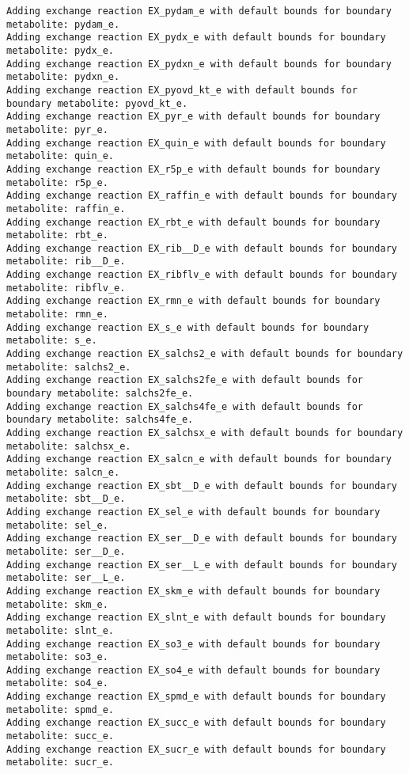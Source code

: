 \documentclass[
  letterpaper,
  DIV=11,
  numbers=noendperiod]{scrartcl}
\begin{document}
\begin{verbatim}
Adding exchange reaction EX_pydam_e with default bounds for boundary metabolite: pydam_e.
Adding exchange reaction EX_pydx_e with default bounds for boundary metabolite: pydx_e.
Adding exchange reaction EX_pydxn_e with default bounds for boundary metabolite: pydxn_e.
Adding exchange reaction EX_pyovd_kt_e with default bounds for boundary metabolite: pyovd_kt_e.
Adding exchange reaction EX_pyr_e with default bounds for boundary metabolite: pyr_e.
Adding exchange reaction EX_quin_e with default bounds for boundary metabolite: quin_e.
Adding exchange reaction EX_r5p_e with default bounds for boundary metabolite: r5p_e.
Adding exchange reaction EX_raffin_e with default bounds for boundary metabolite: raffin_e.
Adding exchange reaction EX_rbt_e with default bounds for boundary metabolite: rbt_e.
Adding exchange reaction EX_rib__D_e with default bounds for boundary metabolite: rib__D_e.
Adding exchange reaction EX_ribflv_e with default bounds for boundary metabolite: ribflv_e.
Adding exchange reaction EX_rmn_e with default bounds for boundary metabolite: rmn_e.
Adding exchange reaction EX_s_e with default bounds for boundary metabolite: s_e.
Adding exchange reaction EX_salchs2_e with default bounds for boundary metabolite: salchs2_e.
Adding exchange reaction EX_salchs2fe_e with default bounds for boundary metabolite: salchs2fe_e.
Adding exchange reaction EX_salchs4fe_e with default bounds for boundary metabolite: salchs4fe_e.
Adding exchange reaction EX_salchsx_e with default bounds for boundary metabolite: salchsx_e.
Adding exchange reaction EX_salcn_e with default bounds for boundary metabolite: salcn_e.
Adding exchange reaction EX_sbt__D_e with default bounds for boundary metabolite: sbt__D_e.
Adding exchange reaction EX_sel_e with default bounds for boundary metabolite: sel_e.
Adding exchange reaction EX_ser__D_e with default bounds for boundary metabolite: ser__D_e.
Adding exchange reaction EX_ser__L_e with default bounds for boundary metabolite: ser__L_e.
Adding exchange reaction EX_skm_e with default bounds for boundary metabolite: skm_e.
Adding exchange reaction EX_slnt_e with default bounds for boundary metabolite: slnt_e.
Adding exchange reaction EX_so3_e with default bounds for boundary metabolite: so3_e.
Adding exchange reaction EX_so4_e with default bounds for boundary metabolite: so4_e.
Adding exchange reaction EX_spmd_e with default bounds for boundary metabolite: spmd_e.
Adding exchange reaction EX_succ_e with default bounds for boundary metabolite: succ_e.
Adding exchange reaction EX_sucr_e with default bounds for boundary metabolite: sucr_e.

\end{verbatim}
\end{document}
